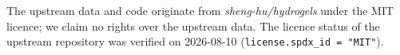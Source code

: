 \documentclass[utf8]{frontiers_suppmat}
\begin{document}
The upstream data and code originate from \emph{sheng-hu/hydrogels} under the MIT licence; we claim no rights over the upstream data. The licence status of the upstream repository was verified on 2026-08-10 (\texttt{license.spdx\_id = "MIT"}).



\end{document}
